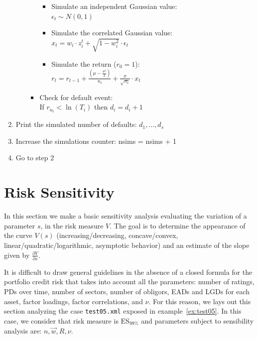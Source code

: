 \documentclass[11pt,fleqn]{book} %
\begin{document}
\begin{algorithm}
\begin{enumerate}
\begin{itemize}
\begin{itemize}
				\begin{itemize}
					\item Simulate an independent Gaussian value: \\
					$\epsilon_t \sim N(0,1)$
					\item Simulate the correlated Gaussian value: \\
					$x_t = w_i \cdot z_i^t + \sqrt{1-w_i^2} \cdot \epsilon_t$
					\item Simulate the return ($r_0 = 1$): \\
					$r_t = r_{t-1} + \frac{\left(\mu - \frac{\sigma^2}{2}\right)}{n_t} + \frac{\sigma}{\sqrt{n_t}} \cdot x_t$
				\end{itemize}
				\item Check for default event:\\
				If $r_{n_t} < \ln(T_i)$ then $d_i = d_i + 1$
			\end{itemize}
		\end{itemize}
		\item Print the simulated number of defaults: $d_1,\dots,d_s$
		\item Increase the simulations counter: nsims = nsims + 1
		\item Go to step 2
	\end{enumerate}
\end{algorithm}


\section{Risk Sensitivity}

In this section we make a basic sensitivity analysis evaluating the variation 
of a parameter $s$, in the risk measure $V$. The goal is to determine the 
appearance of the curve $V(s)$ (increasing/decreasing, concave/convex, 
linear/quadratic/logarithmic, asymptotic behavior) and an estimate of the 
slope given by $\frac{\partial V}{\partial s}$.

It is difficult to draw general guidelines in the absence of a closed formula 
for the portfolio credit risk that takes into account all the parameters: 
number of ratings, PDs over time, number of sectors, number of obligors, EADs 
and LGDs for each asset, factor loadings, factor correlations, and $\nu$. For 
this reason, we lays out this section analyzing the case \texttt{test05.xml} 
exposed in example~\ref{ex:test05}. In this case, we consider that risk 
measure is $\text{ES}_{99\%}$ and parameters subject to sensibility analysis 
are: $n, \vec{w}, R, \nu$.
\end{document}

